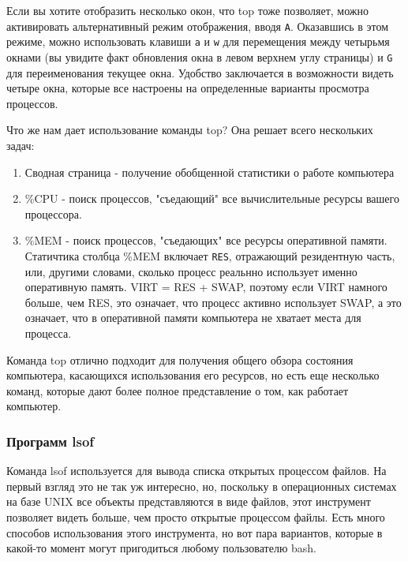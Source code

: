 \documentclass{article}
\begin{document}
Если вы хотите отобразить несколько окон, что top тоже позволяет, можно
активировать альтернативный режим отображения, вводя \texttt{A}.
Оказавшись в этом режиме, можно использовать клавиши \texttt{a} и
\texttt{w} для перемещения между четырьмя окнами (вы увидите факт
обновления окна в левом верхнем углу страницы) и \texttt{G} для
переименования текущее окна. Удобство заключается в возможности видеть
четыре окна, которые все настроены на определенные варианты просмотра
процессов.

Что же нам дает использование команды top? Она решает всего нескольких
задач:

\begin{enumerate}
\tightlist
\item
  Сводная страница - получение обобщенной статистики о работе компьютера
\item
  \%CPU - поиск процессов, "съедающий" все вычислительные ресурсы вашего
  процессора.
\item
  \%MEM - поиск процессов, "съедающих" все ресурсы оперативной памяти.
  Статичтика столбца \%MEM включает \texttt{RES}, отражающий резидентную
  часть, или, другими словами, сколько процесс реальнно использует
  именно оперативную память. VIRT = RES + SWAP, поэтому если VIRT
  намного больше, чем RES, это означает, что процесс активно использует
  SWAP, а это означает, что в оперативной памяти компьютера не хватает
  места для процесса.
\end{enumerate}

Команда top отлично подходит для получения общего обзора состояния
компьютера, касающихся использования его ресурсов, но есть еще несколько
команд, которые дают более полное представление о том, как работает
компьютер.

\hypertarget{lsof}{%
\subsubsection{\texorpdfstring{\protect\hyperlink{lsof}{}Программ
lsof}{Программ lsof}}\label{lsof}}

Команда lsof используется для вывода списка открытых процессом файлов.
На первый взгляд это не так уж интересно, но, поскольку в операционных
системах на базе UNIX все объекты представляются в виде файлов, этот
инструмент позволяет видеть больше, чем просто открытые процессом файлы.
Есть много способов использования этого инструмента, но вот пара
вариантов, которые в какой-то момент могут пригодиться любому
пользователю bash.
\end{document}
